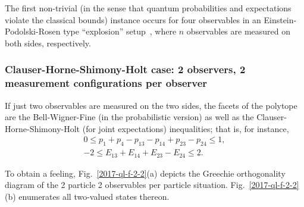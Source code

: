 The first non-trivial (in the sense that quantum probabilities and expectations violate the classical bounds) instance
occurs for four observables in an Einstein-Podolski-Rosen type ``explosion'' setup~\cite{epr},
where $n$ observables are measured on both sides, respectively.

\subsubsection*{Clauser-Horne-Shimony-Holt case: 2 observers, 2 measurement configurations per observer}
\label{2017-b-chshc1}

If  just two observables are measured on the two sides,
the facets of the polytope
are
the Bell-Wigner-Fine (in the probabilistic version)
as well as the Clauser-Horne-Shimony-Holt (for joint expectations)  inequalities;
that is, for instance,
\begin{equation}
\begin{split}
0\le   p_{1} +p_{4}  -p_{13}  -p_{14}  +p_{23}  -p_{24}       \le   1,\\
-2 \le   E_{13} + E_{14} + E_{23} - E_{24}        \le       2   .
\end{split}
\label{2017-b-2-2-e-p}
\end{equation}

To obtain a feeling, Fig.~\ref{2017-ql-f-2-2}(a)  depicts the Greechie orthogonality diagram of the 2 particle 2 observables per particle situation.
Fig.~\ref{2017-ql-f-2-2}(b) enumerates all two-valued states thereon.

